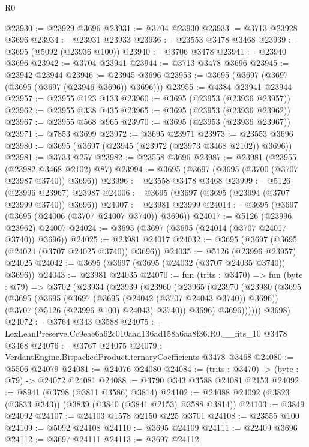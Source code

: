 \begin{lexlean}{R0}
\begin{coremodule}
@23930 := @23929 @3696
@23931 := @3704 @23930
@23933 := @3713 @23928 @3696
@23934 := @23931 @23933
@23936 := @23553 @3478 @3468
@23939 := @3695 (@5092 (@23936 @100))
@23940 := @3706 @3478
@23941 := @23940 @3696
@23942 := @3704 @23941
@23944 := @3713 @3478 @3696
@23945 := @23942 @23944
@23946 := @23945 @3696
@23953 := @3695 (@3697 (@3697 (@3695 (@3697 (@23946 @3696)) @3696)))
@23955 := @4384 @23941 @23944
@23957 := @23955 @123 @133
@23960 := @3695 (@23953 (@23936 @23957))
@23962 := @23955 @338 @435
@23965 := @3695 (@23953 (@23936 @23962))
@23967 := @23955 @568 @965
@23970 := @3695 (@23953 (@23936 @23967))
@23971 := @7853 @3699
@23972 := @3695 @23971
@23973 := @23553 @3696
@23980 := @3695 (@3697 (@23945 (@23972 (@23973 @3468 @2102)) @3696))
@23981 := @3733 @257
@23982 := @23558 @3696
@23987 := @23981 (@23955 (@23982 @3468 @2102) @87)
@23994 := @3695 (@3697 (@3695 (@3700 (@3707 @23987 @3740)) @3696))
@23996 := @23558 @3478 @3468
@23999 := @5126 (@23996 @23967) @23987
@24006 := @3695 (@3697 (@3695 (@23994 (@3707 @23999 @3740)) @3696))
@24007 := @23981 @23999
@24014 := @3695 (@3697 (@3695 (@24006 (@3707 @24007 @3740)) @3696))
@24017 := @5126 (@23996 @23962) @24007
@24024 := @3695 (@3697 (@3695 (@24014 (@3707 @24017 @3740)) @3696))
@24025 := @23981 @24017
@24032 := @3695 (@3697 (@3695 (@24024 (@3707 @24025 @3740)) @3696))
@24035 := @5126 (@23996 @23957) @24025
@24042 := @3695 (@3697 (@3695 (@24032 (@3707 @24035 @3740)) @3696))
@24043 := @23981 @24035
@24070 := fun (trits : @3470) =>
  fun (byte : @79) =>
  @3702
    (@23934
      (@23939
        (@23960
          (@23965
            (@23970
              (@23980
                (@3695
                  (@3695
                    (@3695
                      (@3697 (@3695 (@24042 (@3707 @24043 @3740)) @3696))
                      (@3707 (@5126 (@23996 @100) @24043) @3740))
                    @3696)
                  @3696))))))
      @3698)
@24072 := @3764 @343 @3588
@24075 := LexLeanPreserve.Cc9eae6a62c010aad136ad158a6aa8f36.R0.__fits_10 @3478 @3468
@24076 := @3767 @24075
@24079 := VerdantEngine.BitpackedProduct.ternaryCoefficients @3478 @3468
@24080 := @5506 @24079
@24081 := @24076 @24080
@24084 := (trits : @3470) -> (byte : @79) -> @24072 @24081
@24088 := @3790 @343 @3588 @24081 @2153
@24092 := @8941 (@3798 (@3811 @3586) @3814)
@24102 := @24088 @24092 (@3823 (@3833 @343)) (@3839 (@3840 (@3841 @2153) @3588 @3814))
@24103 := @3849 @24092
@24107 := @24103 @1578 @2150 @225 @3701
@24108 := @23555 @100
@24109 := @5092 @24108
@24110 := @3695 @24109
@24111 := @22409 @3696
@24112 := @3697 @24111
@24113 := @3697 @24112

\end{coremodule}
\end{lexlean}
